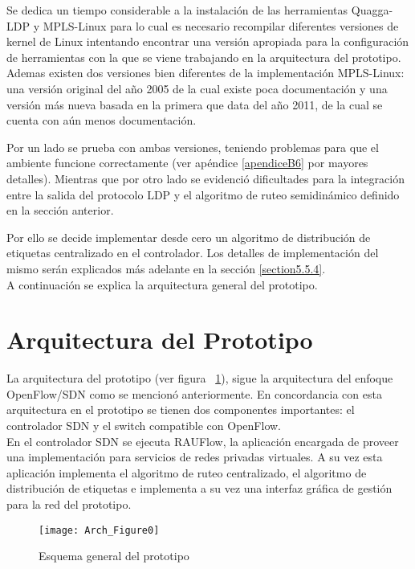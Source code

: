 Se dedica un tiempo considerable a la instalaci\'on de las herramientas Quagga-LDP y MPLS-Linux para lo cual es necesario recompilar diferentes versiones de kernel de Linux intentando encontrar una versi\'on apropiada para la configuración de herramientas con la que se viene trabajando en la arquitectura del prototipo. Ademas existen dos versiones bien diferentes de la implementaci\'on MPLS-Linux: una versi\'on original del año 2005 de la cual existe poca documentación y una versi\'on m\'as nueva basada en la primera que data del año 2011, de la cual se cuenta con a\'un menos documentación. 

Por un lado se prueba con ambas versiones, teniendo problemas para que el ambiente funcione correctamente (ver apéndice \ref{apendiceB6} por mayores detalles). Mientras que por otro lado se evidenci\'o dificultades para la integración entre la salida del protocolo LDP y el algoritmo de ruteo semidin\'amico definido en la sección anterior.

Por ello se decide implementar desde cero un algoritmo de distribución de etiquetas centralizado en el controlador. Los detalles de implementaci\'on del mismo ser\'an explicados m\'as adelante en la sección \ref{section5.5.4}.\\

A continuación se explica la arquitectura general del prototipo. 

\section{Arquitectura del Prototipo}

La arquitectura del prototipo (ver figura ~\ref{fig:OpenSourceRArch0}), sigue la arquitectura del enfoque OpenFlow/SDN como se mencion\'o anteriormente. En concordancia con esta arquitectura en el prototipo se tienen dos componentes importantes: el controlador SDN y el switch compatible con OpenFlow.\\

En el controlador SDN se ejecuta RAUFlow, la aplicaci\'on encargada de proveer una implementaci\'on para servicios de redes privadas virtuales. A su vez esta aplicaci\'on implementa el algoritmo de ruteo  centralizado, el algoritmo de distribución de etiquetas e implementa a su vez una interfaz gr\'afica de gesti\'on para la red del prototipo.\\

\begin{figure}[htbp!] 
\centering    
\texttt{[image: Arch\_Figure0]}
\caption[OpenSourceRArch0]{Esquema general del prototipo}
\label{fig:OpenSourceRArch0}
\end{figure}

